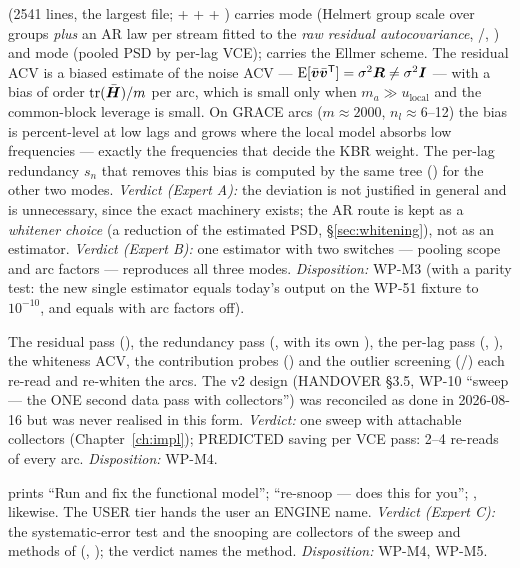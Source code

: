   (2541 lines, the largest file;  +  +  + ) carries mode  (Helmert group scale over  groups \emph{plus} an AR law per stream fitted to the \emph{raw residual autocovariance}, /, ) and mode  (pooled PSD by per-lag VCE);  carries the Ellmer scheme. The residual ACV is a biased estimate of the noise ACV --- $\operatorname{E}[\bar{\bm{v}}\bar{\bm{v}}^{\mathsf T}] = \sigma^2\bm{R} \ne \sigma^2\bm{I}$ --- with a bias of order $\operatorname{tr}(\bar{\bm{H}})/m$ per arc, which is small only when $m_a \gg u_{\text{local}}$ and the common-block leverage is small. On GRACE arcs ($m\approx 2000$, $n_l\approx 6$--12) the bias is percent-level at low lags and grows where the local model absorbs low frequencies --- exactly the frequencies that decide the KBR weight. The per-lag redundancy $s_n$ that removes this bias is computed by the same tree () for the other two modes. \textit{Verdict (Expert A):} the deviation is not justified in general and is unnecessary, since the exact machinery exists; the AR route is kept as a \emph{whitener choice} (a reduction of the estimated PSD, \S\ref{sec:whitening}), not as an estimator. \textit{Verdict (Expert B):} one estimator with two switches --- pooling scope and arc factors --- reproduces all three modes. \textit{Disposition:} WP-M3 (with a parity test: the new single estimator equals today's  output on the WP-51 fixture to $10^{-10}$, and equals  with arc factors off).

 The residual pass (), the redundancy pass (, with its own ), the per-lag pass (, ), the whiteness ACV, the contribution probes () and the outlier screening (/) each re-read and re-whiten the arcs. The v2 design (HANDOVER §3.5, WP-10 ``sweep --- the ONE second data pass with collectors'') was reconciled as done in 2026-08-16 but was never realised in this form. \textit{Verdict:} one sweep with attachable collectors (Chapter~\ref{ch:impl}); PREDICTED saving per VCE pass: 2--4 re-reads of every arc. \textit{Disposition:} WP-M4.

  prints ``Run  and fix the functional model'';  ``re-snoop ---  does this for you''; ,  likewise. The USER tier hands the user an ENGINE name. \textit{Verdict (Expert C):} the systematic-error test and the snooping are collectors of the sweep and methods of  (, ); the verdict names the method. \textit{Disposition:} WP-M4, WP-M5.

